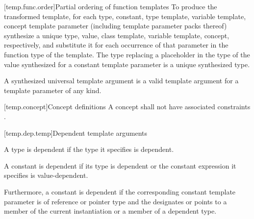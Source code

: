 \documentclass{wg21}
\begin{document}
[temp.func.order]{Partial ordering of function templates}
\pnum
To produce the transformed template, for each
type, constant,
type template, variable template,  concept
template parameter (including template parameter packs 
thereof) synthesize a unique type, value, class template,
variable template,  concept,
respectively, and substitute it for each occurrence of that parameter
in the function type of the template.
The type replacing a placeholder
in the type of the value synthesized for a constant template parameter
is a unique synthesized type.
\begin{addedblock}
\begin{note}
    A synthesized universal template argument is a valid template argument  for a template parameter of any kind.
\end{note}

\end{addedblock}


[temp.concept]{Concept definitions}
\pnum
A concept shall not have associated constraints .\\


[temp.dep.temp]{Dependent template arguments}

\pnum
A type
is dependent if the type it specifies is dependent.

\pnum
A constant
is dependent if its type is dependent or the constant
expression it specifies is value-dependent.

\pnum
Furthermore, a constant
is dependent if the corresponding constant template parameter
is of reference or pointer type and the 
designates or points to a member of the current instantiation or a member of
a dependent type.
\end{document}
